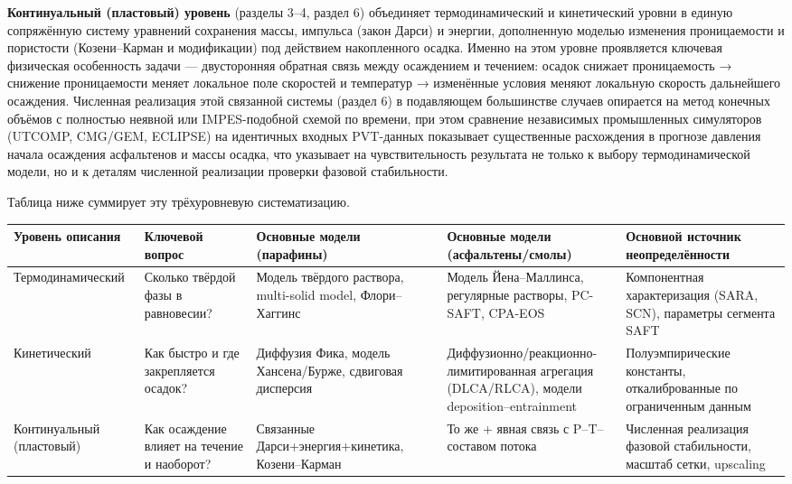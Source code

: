 \documentclass[11pt]{extarticle}
\begin{document}
\textbf{Континуальный (пластовый) уровень} (разделы 3--4, раздел 6) объединяет термодинамический и кинетический уровни в единую сопряжённую систему уравнений сохранения массы, импульса (закон Дарси) и энергии, дополненную моделью изменения проницаемости и пористости (Козени--Карман и модификации) под действием накопленного осадка. Именно на этом уровне проявляется ключевая физическая особенность задачи --- двусторонняя обратная связь между осаждением и течением: осадок снижает проницаемость → снижение проницаемости меняет локальное поле скоростей и температур → изменённые условия меняют локальную скорость дальнейшего осаждения. Численная реализация этой связанной системы (раздел 6) в подавляющем большинстве случаев опирается на метод конечных объёмов с полностью неявной или IMPES-подобной схемой по времени, при этом сравнение независимых промышленных симуляторов (UTCOMP, CMG/GEM, ECLIPSE) на идентичных входных PVT-данных показывает существенные расхождения в прогнозе давления начала осаждения асфальтенов и массы осадка, что указывает на чувствительность результата не только к выбору термодинамической модели, но и к деталям численной реализации проверки фазовой стабильности.

Таблица ниже суммирует эту трёхуровневую систематизацию.

{\def\LTcaptype{none} %
\begin{xltabular}{\linewidth}{@{}
  >{\raggedright\arraybackslash}X
  >{\raggedright\arraybackslash}X
  >{\raggedright\arraybackslash}X
  >{\raggedright\arraybackslash}X
  >{\raggedright\arraybackslash}X@{}}
\toprule\noalign{}
Уровень описания & Ключевой вопрос & Основные модели (парафины) & Основные модели (асфальтены/смолы) & Основной источник неопределённости \\
\midrule\noalign{}
\endhead
\bottomrule\noalign{}
\endlastfoot
Термодинамический & Сколько твёрдой фазы в равновесии? & Модель твёрдого раствора, multi-solid model, Флори--Хаггинс & Модель Йена--Маллинса, регулярные растворы, PC-SAFT, CPA-EOS & Компонентная характеризация (SARA, SCN), параметры сегмента SAFT \\
Кинетический & Как быстро и где закрепляется осадок? & Диффузия Фика, модель Хансена/Бурже, сдвиговая дисперсия & Диффузионно/реакционно-лимитированная агрегация (DLCA/RLCA), модели deposition--entrainment & Полуэмпирические константы, откалиброванные по ограниченным данным \\
Континуальный (пластовый) & Как осаждение влияет на течение и наоборот? & Связанные Дарси+энергия+кинетика, Козени--Карман & То же + явная связь с P--T--составом потока & Численная реализация фазовой стабильности, масштаб сетки, upscaling \\
\end{xltabular}
}
\end{document}
